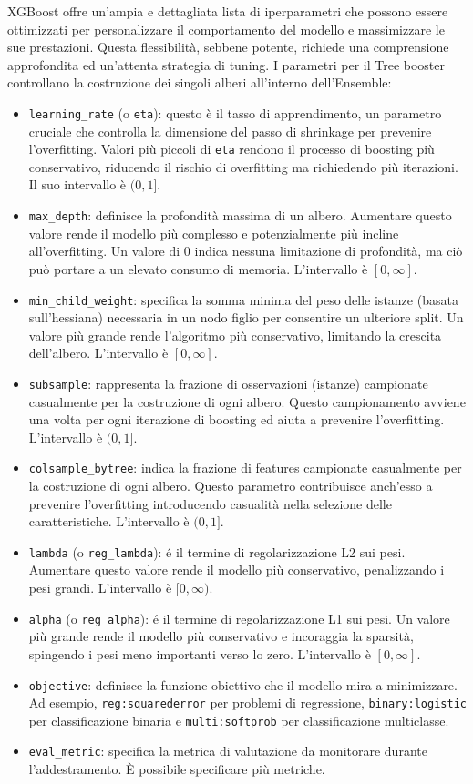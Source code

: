\documentclass[a4paper,12pt]{report}
\begin{document}
	XGBoost offre un'ampia e dettagliata lista di iperparametri che possono essere ottimizzati per personalizzare il comportamento del modello e massimizzare le sue prestazioni. Questa flessibilità, sebbene potente, richiede una comprensione approfondita ed un'attenta strategia di tuning.
	I parametri per il Tree booster controllano la costruzione dei singoli alberi all'interno dell'Ensemble:
	\begin{itemize}
		\item \texttt{learning\_rate} (o \texttt{eta}): questo è il tasso di apprendimento, un parametro cruciale che controlla la dimensione del passo di shrinkage per prevenire l'overfitting. Valori più piccoli di \texttt{eta} rendono il processo di boosting più conservativo, riducendo il rischio di overfitting ma richiedendo più iterazioni. Il suo intervallo è $(0, 1]$.
		\item \texttt{max\_depth}: definisce la profondità massima di un albero. Aumentare questo valore rende il modello più complesso e potenzialmente più incline all'overfitting. Un valore di $0$ indica nessuna limitazione di profondità, ma ciò può portare a un elevato consumo di memoria. L'intervallo è $[0, \infty]$.
		\item \texttt{min\_child\_weight}: specifica la somma minima del peso delle istanze (basata sull'hessiana) necessaria in un nodo figlio per consentire un ulteriore split. Un valore più grande rende l'algoritmo più conservativo, limitando la crescita dell'albero. L'intervallo è $[0, \infty]$.
		\item \texttt{subsample}: rappresenta la frazione di osservazioni (istanze) campionate casualmente per la costruzione di ogni albero. Questo campionamento avviene una volta per ogni iterazione di boosting ed aiuta a prevenire l'overfitting. L'intervallo è $(0, 1]$.
		\item \texttt{colsample\_bytree}: indica la frazione di features campionate casualmente per la costruzione di ogni albero. Questo parametro contribuisce anch'esso a prevenire l'overfitting introducendo casualità nella selezione delle caratteristiche. L'intervallo è $(0, 1]$.
		\item \texttt{lambda} (o \texttt{reg\_lambda}): é il termine di regolarizzazione L2 sui pesi. Aumentare questo valore rende il modello più conservativo, penalizzando i pesi grandi. L'intervallo è $[0, \infty)$.
		\item \texttt{alpha} (o \texttt{reg\_alpha}): é il termine di regolarizzazione L1 sui pesi. Un valore più grande rende il modello più conservativo e incoraggia la sparsità, spingendo i pesi meno importanti verso lo zero. L'intervallo è $[0, \infty]$.
		\item \texttt{objective}: definisce la funzione obiettivo che il modello mira a minimizzare. Ad esempio, \texttt{reg:squarederror} per problemi di regressione, \texttt{binary:logistic} per classificazione binaria e \texttt{multi:softprob} per classificazione multiclasse.
		\item \texttt{eval\_metric}: specifica la metrica di valutazione da monitorare durante l'addestramento. È possibile specificare più metriche.
	\end{itemize}
\end{document}

